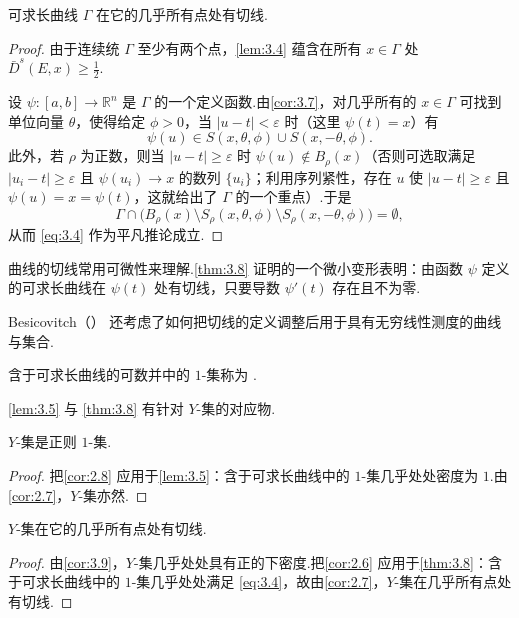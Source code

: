 \begin{theorem}\label{thm:3.8}
可求长曲线 $\Gamma$ 在它的几乎所有点处有切线.
\end{theorem}

\begin{proof}
由于连续统 $\Gamma$ 至少有两个点，\cref{lem:3.4} 蕴含在所有 $x\in\Gamma$ 处 $\bar{D}^s(E,x)\geq\frac{1}{2}$.

设 $\psi:[a,b]\to\mathbb{R}^n$ 是 $\Gamma$ 的一个定义函数.由\cref{cor:3.7}，对几乎所有的 $x\in\Gamma$ 可找到单位向量 $\theta$，使得给定 $\phi>0$，当 $|u-t|<\varepsilon$ 时（这里 $\psi(t)=x$）有
\[
  \psi(u)\in S(x,\theta,\phi)\cup S(x,-\theta,\phi).
\]
此外，若 $\rho$ 为正数，则当 $|u-t|\geq\varepsilon$ 时 $\psi(u)\notin B_\rho(x)$（否则可选取满足 $|u_i-t|\geq\varepsilon$ 且 $\psi(u_i)\to x$ 的数列 $\{u_i\}$；利用序列紧性，存在 $u$ 使 $|u-t|\geq\varepsilon$ 且 $\psi(u)=x=\psi(t)$，这就给出了 $\Gamma$ 的一个重点）.于是
\[
  \Gamma\cap\bigl(B_{\rho}(x)\setminus S_{\rho}(x,\theta,\phi)\setminus S_{\rho}(x,-\theta,\phi)\bigr)=\emptyset,
\]
从而 \eqref{eq:3.4} 作为平凡推论成立.
\end{proof}

曲线的切线常用可微性来理解.\cref{thm:3.8} 证明的一个微小变形表明：由函数 $\psi$ 定义的可求长曲线在 $\psi(t)$ 处有切线，只要导数 $\psi'(t)$ 存在且不为零.

Besicovitch（\citeyear{besicovitch1934a,besicovitch1956,besicovitch1957,besicovitch1960}） 还考虑了如何把切线的定义调整后用于具有无穷线性测度的曲线与集合.

含于可求长曲线的可数并中的 $1$-集称为 .

\cref{lem:3.5} 与 \cref{thm:3.8} 有针对 $Y$-集的对应物.

\begin{corollary}\label{cor:3.9}
$Y$-集是正则 $1$-集.
\end{corollary}

\begin{proof}
把\cref{cor:2.8} 应用于\cref{lem:3.5}：含于可求长曲线中的 $1$-集几乎处处密度为 $1$.由\cref{cor:2.7}，$Y$-集亦然.
\end{proof}

\begin{corollary}\label{cor:3.10}
$Y$-集在它的几乎所有点处有切线.
\end{corollary}

\begin{proof}
由\cref{cor:3.9}，$Y$-集几乎处处具有正的下密度.把\cref{cor:2.6} 应用于\cref{thm:3.8}：含于可求长曲线中的 $1$-集几乎处处满足 \eqref{eq:3.4}，故由\cref{cor:2.7}，$Y$-集在几乎所有点处有切线.
\end{proof}


